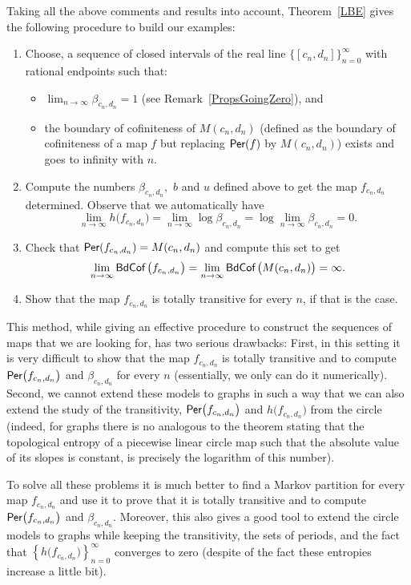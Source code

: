 \documentclass[a4paper, 11pt]{amsart}
\numberwithin{equation}{section}
\theoremstyle{customnumberedtheorem}
\theoremstyle{definitionwithbfnote}
\DeclareMathOperator{\bc}{\textsf{\upshape BdCof\,}}
\DeclareMathOperator{\Per}{\textsf{\upshape Per}}
\begin{document}
Taking all the above comments and results into account,
Theorem~\ref{LBE} gives the following procedure to build our examples:
\begin{enumerate}[{\footnotesize$\blacktriangleright$}]
 \item Choose, a sequence of closed intervals of the real
       line $\{[c_n,d_n]\}_{n=0}^\infty$
       with rational endpoints such that:
       \begin{itemize}
         \item $\lim_{n\to\infty} \beta_{c_n,d_n} = 1$ (see Remark~\ref{PropsGoingZero}), and
         \item the boundary of cofiniteness of $M(c_n,d_n)$
               (defined as the boundary of cofiniteness of a map $f$
               but replacing $\Per(f)$ by $M(c_n,d_n)$)
               exists and goes to infinity with $n.$
       \end{itemize}
  \item Compute the numbers $\beta_{c_n,d_n},$ $b$ and $u$ defined above
        to get the map $f_{c_n,d_n}$ determined.
        Observe that we automatically have
        \[ \lim_{n\to\infty} h\bigl(f_{c_n,d_n}\bigr) = \lim_{n\to\infty} \log \beta_{c_n,d_n} = \log\lim_{n\to\infty} \beta_{c_n,d_n} = 0.\]
  \item Check that $\Per(f_{c_n,d_n}) = M(c_n,d_n)$ and compute this set to get
        \[ \lim_{n\to\infty} \bc\bigl(f_{c_n,d_n}\bigr) = \lim_{n\to\infty} \bc\bigl(M(c_n,d_n)\bigr) = \infty.\]
  \item Show that the map $f_{c_n,d_n}$ is totally transitive
        for every $n$, if that is the case.
\end{enumerate}

This method, while giving an effective procedure to construct the
sequences of maps that we are looking for, has two serious drawbacks:
First, in this setting it is very difficult to show that the map
$f_{c_n,d_n}$ is totally transitive and
to compute $\Per\bigl(f_{c_n,d_n}\bigr)$ and $\beta_{c_n,d_n}$
for every $n$ (essentially, we only can do it numerically).
Second, we cannot extend these models to graphs in
such a way that we can also extend the study of the transitivity,
$\Per\bigl(f_{c_n,d_n}\bigr)$ and $h\bigl(f_{c_n,d_n}\bigr)$
from the circle (indeed, for graphs there is no analogous to the theorem
stating that the topological entropy of a piecewise linear circle map
such that the absolute value of its slopes is constant,
is precisely the logarithm of this number).

To solve all these problems it is much better
to find a Markov partition for every map $f_{c_n,d_n}$ and
use it to prove that it is totally transitive and
to compute $\Per\bigl(f_{c_n,d_n}\bigr)$ and $\beta_{c_n,d_n}.$
Moreover, this also gives a good tool to extend the circle models
to graphs while keeping the transitivity,
the sets of periods, and the fact that
$\left\{h\bigl(f_{c_n,d_n}\bigr)\right\}_{n=0}^\infty$
converges to zero
(despite of the fact these entropies increase  a little bit).
\end{document}
